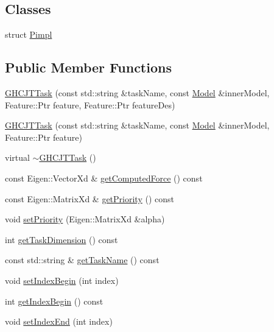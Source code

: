 \subsection*{Classes}
\begin{DoxyCompactItemize}
\item 
struct \hyperlink{structgocra_1_1GHCJTTask_1_1Pimpl}{Pimpl}
\end{DoxyCompactItemize}
\subsection*{Public Member Functions}
\begin{DoxyCompactItemize}
\item 
\hyperlink{classgocra_1_1GHCJTTask_a9161a72cfe5261e5a3580fba578ef23f}{G\+H\+C\+J\+T\+Task} (const std\+::string \&task\+Name, const \hyperlink{classocra_1_1Model}{Model} \&inner\+Model, Feature\+::\+Ptr feature, Feature\+::\+Ptr feature\+Des)
\item 
\hyperlink{classgocra_1_1GHCJTTask_a45a0f844d1e8e3a2d500da01a6606a03}{G\+H\+C\+J\+T\+Task} (const std\+::string \&task\+Name, const \hyperlink{classocra_1_1Model}{Model} \&inner\+Model, Feature\+::\+Ptr feature)
\item 
virtual \hyperlink{classgocra_1_1GHCJTTask_a258ac19e0b4a3aab26b4aebfeb2c26d8}{$\sim$\+G\+H\+C\+J\+T\+Task} ()
\item 
const Eigen\+::\+Vector\+Xd \& \hyperlink{classgocra_1_1GHCJTTask_aff9154677810b8f736fe1424031fad1e}{get\+Computed\+Force} () const 
\item 
const Eigen\+::\+Matrix\+Xd \& \hyperlink{classgocra_1_1GHCJTTask_a55cf2d8275ea792dbc53db8ad787fc9a}{get\+Priority} () const 
\item 
void \hyperlink{classgocra_1_1GHCJTTask_a5dce074858a320d3277eb5e0c8fc1d0c}{set\+Priority} (Eigen\+::\+Matrix\+Xd \&alpha)
\item 
int \hyperlink{classgocra_1_1GHCJTTask_a44de21e01e848514061510735b148f03}{get\+Task\+Dimension} () const 
\item 
const std\+::string \& \hyperlink{classgocra_1_1GHCJTTask_a25f1ae9fd53fb5d94ddb2610d27165e4}{get\+Task\+Name} () const 
\item 
void \hyperlink{classgocra_1_1GHCJTTask_adb7d719214756cc13927b3587b4e6219}{set\+Index\+Begin} (int index)
\item 
int \hyperlink{classgocra_1_1GHCJTTask_a70bf99071047d1d04819077bcaa57ade}{get\+Index\+Begin} () const 
\item 
void \hyperlink{classgocra_1_1GHCJTTask_a26739b301ace2b23b7217f5aa18afd5e}{set\+Index\+End} (int index)

\end{DoxyCompactItemize}
